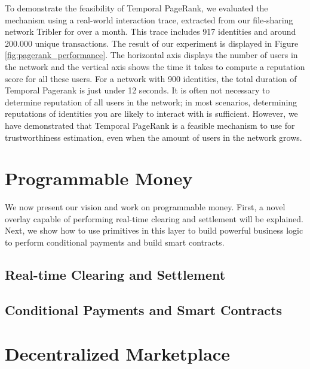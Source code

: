 \documentclass[USenglish]{article}
\begin{document}
To demonstrate the feasibility of Temporal PageRank, we evaluated the mechanism using a real-world interaction trace, extracted from our file-sharing network Tribler for over a month.
This trace includes 917 identities and around 200.000 unique transactions.
The result of our experiment is displayed in Figure \ref{fig:pagerank_performance}.
The horizontal axis displays the number of users in the network and the vertical axis shows the time it takes to compute a reputation score for all these users.
For a network with 900 identities, the total duration of Temporal Pagerank is just under 12 seconds.
It is often not necessary to determine reputation of all users in the network; in most scenarios, determining reputations of identities you are likely to interact with is sufficient.
However, we have demonstrated that Temporal PageRank is a feasible mechanism to use for trustworthiness estimation, even when the amount of users in the network grows.

\section{Programmable Money}
We now present our vision and work on programmable money.
First, a novel overlay capable of performing real-time clearing and settlement will be explained.
Next, we show how to use primitives in this layer to build powerful business logic to perform conditional payments and build smart contracts.

\subsection{Real-time Clearing and Settlement}
\label{sec:internet_of_money}

\subsection{Conditional Payments and Smart Contracts}
\label{sec:smart_contracts}

\section{Decentralized Marketplace}
\end{document}
